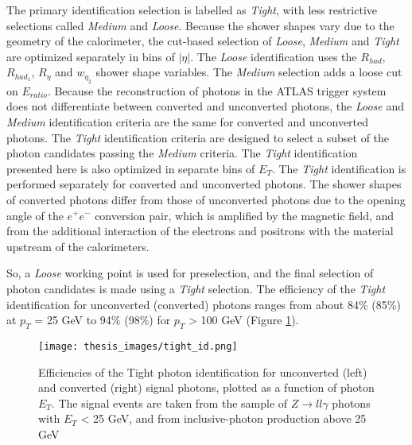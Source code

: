 \documentclass[a4paper, oneside, 11pt, openright]{book}
\begin{document}
				The primary identification selection is labelled as \textit{Tight}, with less restrictive selections called \textit{Medium} and \textit{Loose}. Because the shower shapes vary due to the geometry of the calorimeter, the cut-based selection of \textit{Loose}, \textit{Medium} and \textit{Tight} are optimized separately in bins of $|\eta|$. The \textit{Loose} identification uses the $R_{had}$, $R_{had_1}$, $R_{\eta}$ and $w_{\eta_2}$ shower shape variables. The \textit{Medium} selection adds a loose cut on $E_{ratio}$. Because the reconstruction of photons in the ATLAS trigger system does not differentiate between converted and unconverted photons, the \textit{Loose} and \textit{Medium} identification criteria are the same for converted and unconverted photons. The \textit{Tight} identification criteria are designed to select a subset of the photon candidates passing the \textit{Medium} criteria. The \textit{Tight} identification presented here is also optimized in separate bins of $E_T$. The \textit{Tight} identification is performed separately for converted and unconverted photons. The shower shapes of converted photons differ from those of unconverted photons due to the opening angle of the $e^+e^-$ conversion pair, which is amplified by the magnetic field, and from the additional interaction of the electrons and positrons with the material upstream of the calorimeters. 
				
				So, a \textit{Loose} working point is used for preselection, and the final selection of photon candidates is made using a \textit{Tight} selection. The efficiency of the \textit{Tight} identification for unconverted (converted) photons ranges from about 84\% (85\%) at $p_T$ = 25 GeV to 94\% (98\%) for $p_T$ > 100 GeV \cite{Aad_2019} (Figure \ref{fig:tight_id}).
				
				\vspace{-1.83cm}
				
				\begin{figure}
					\centering
					\texttt{[image: thesis\_images/tight\_id.png]} 
					\caption{Efficiencies of the Tight photon identification for unconverted (left) and converted (right) signal photons, plotted as a function of photon $E_T$. The signal events are taken from the sample of $Z\to ll\gamma$ photons with $E_T$ < 25 GeV,	and from inclusive-photon production above 25 GeV}
					\label{fig:tight_id}
				\end{figure}
				
\end{document}
